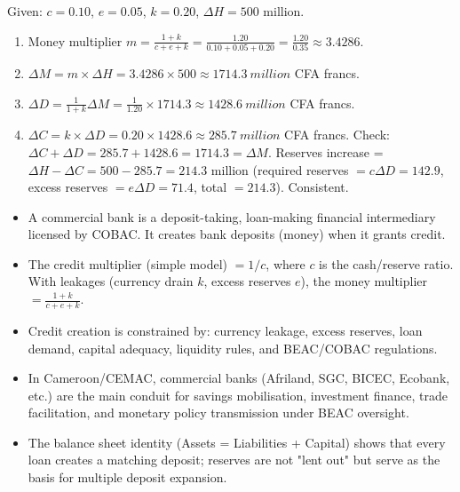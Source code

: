 \documentclass[11pt]{article}
\newcommand{\cle}[1]{{\popxbold\color{popdark}#1}}
\newcounter{popsec}
\newcounter{popsub}
\newcommand{\courssub}[1]{%
  \stepcounter{popsub}%
  \par\vspace{9pt}\noindent{\popxbold\fontsize{11.5}{13}\selectfont\color{popink}{\color{poporange}\thepopsec.\thepopsub}\hspace{6pt}#1}\par\nopagebreak\vspace{4pt}
}
\begin{document}
\begin{corrige}[Exercise 1]
Given: $c = 0.10$, $e = 0.05$, $k = 0.20$, $\Delta H = 500$ million.
\begin{enumerate}
\item Money multiplier $m = \frac{1 + k}{c + e + k} = \frac{1.20}{0.10 + 0.05 + 0.20} = \frac{1.20}{0.35} \approx 3.4286$.
\item $\Delta M = m \times \Delta H = 3.4286 \times 500 \approx \SI{1714.3}{million}$ CFA francs.
\item $\Delta D = \frac{1}{1+k} \Delta M = \frac{1}{1.20} \times 1714.3 \approx \SI{1428.6}{million}$ CFA francs.
\item $\Delta C = k \times \Delta D = 0.20 \times 1428.6 \approx \SI{285.7}{million}$ CFA francs.
Check: $\Delta C + \Delta D = 285.7 + 1428.6 = 1714.3 = \Delta M$. Reserves increase = $\Delta H - \Delta C = 500 - 285.7 = 214.3$ million (required reserves $= c \Delta D = 142.9$, excess reserves $= e \Delta D = 71.4$, total $= 214.3$). Consistent.
\end{enumerate}
\end{corrige}

\courssub{Summary}

\begin{aretenir}
\begin{itemize}
\item A \cle{commercial bank} is a deposit-taking, loan-making financial intermediary licensed by COBAC. It creates \cle{bank deposits} (money) when it grants credit.
\item The \cle{credit multiplier} (simple model) $= 1/c$, where $c$ is the cash/reserve ratio. With leakages (currency drain $k$, excess reserves $e$), the \cle{money multiplier} $= \frac{1+k}{c+e+k}$.
\item Credit creation is constrained by: currency leakage, excess reserves, loan demand, capital adequacy, liquidity rules, and BEAC/COBAC regulations.
\item In Cameroon/CEMAC, commercial banks (Afriland, SGC, BICEC, Ecobank, etc.) are the main conduit for savings mobilisation, investment finance, trade facilitation, and monetary policy transmission under BEAC oversight.
\item The balance sheet identity (Assets = Liabilities + Capital) shows that every loan creates a matching deposit; reserves are not "lent out" but serve as the basis for multiple deposit expansion.
\end{itemize}
\end{aretenir}
\end{document}
